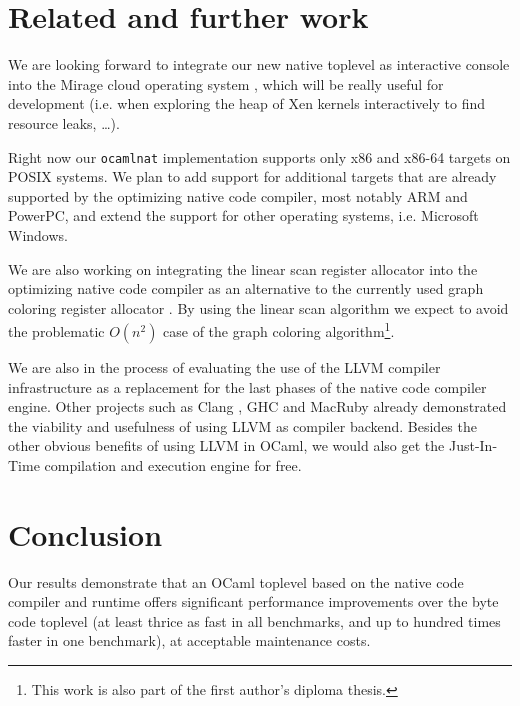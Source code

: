\documentclass[10pt,a4paper,draft,twocolumn]{article}
\makeatletter
\newcommand{\ie}{i.e.\@\xspace}
\makeatother
\begin{document}
\section{Related and further work} \label{section:Related_and_further_work}

We are looking forward to integrate our new native toplevel as interactive console
into the Mirage cloud operating system \cite{Mirage11,Madhavapeddy10,Madhavapeddy10hotcloud}, which
will be really useful for development (\ie when exploring the heap of Xen kernels interactively to
find resource leaks, \ldots).

Right now our \texttt{ocamlnat} implementation supports only x86 and x86-64 targets on POSIX systems.
We plan to add support for additional targets that are already supported by the optimizing native
code compiler, most notably ARM and PowerPC, and extend the support for other operating systems,
\ie Microsoft Windows.

We are also working on integrating the linear scan register allocator \cite{PolettoS99,WimmerM05}
into the optimizing native code compiler as an alternative to the currently used graph coloring
register allocator \cite{Aho06}. By using the linear scan algorithm we expect to avoid the problematic
$O(n^2)$ case of the graph coloring algorithm\footnote{This work is also part of the first author's
diploma thesis.}.

We are also in the process of evaluating the use of the LLVM compiler infrastructure
\cite{Lattner02,Lattner04,LLVM11} as a replacement
for the last phases of the native code compiler engine. Other projects such as Clang \cite{Clang11},
GHC \cite{Terei10} and MacRuby \cite{MacRuby11} already demonstrated the viability and usefulness of
using LLVM as compiler backend. Besides the other obvious benefits of using LLVM in OCaml, we would
also get the Just-In-Time compilation and execution engine for free.


\section{Conclusion} \label{section:Conclusion}

Our results demonstrate that an OCaml toplevel based on the native code compiler and runtime offers
significant performance improvements over the byte code toplevel (at least thrice as fast in all
benchmarks, and up to hundred times faster in one benchmark), at acceptable maintenance costs.
\end{document}
